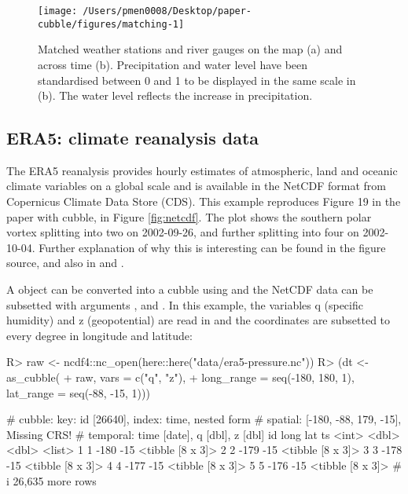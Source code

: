 \documentclass[
  shortnames]{jss}
\begin{document}
\begin{CodeChunk}
\begin{figure}

{\centering \texttt{[image: /Users/pmen0008/Desktop/paper-cubble/figures/matching-1]} 

}

\caption[Matched weather stations and river gauges on the map (a) and across time (b)]{Matched weather stations and river gauges on the map (a) and across time (b). Precipitation and water level have been standardised between 0 and 1 to be displayed in the same scale in (b). The water level reflects the increase in precipitation.}\label{fig:matching}
\end{figure}
\end{CodeChunk}

\hypertarget{era5-climate-reanalysis-data}{%
\subsection{ERA5: climate reanalysis data}\label{era5-climate-reanalysis-data}}

The ERA5 reanalysis \citep{hersbach2020era5} provides hourly estimates of atmospheric, land and oceanic climate variables on a global scale and is available in the NetCDF format from Copernicus Climate Data Store (CDS). This example reproduces Figure 19 in the \citet{hersbach2020era5} paper with cubble, in Figure \ref{fig:netcdf}. The plot shows the southern polar vortex splitting into two on 2002-09-26, and further splitting into four on 2002-10-04. Further explanation of why this is interesting can be found in the figure source, and also in \citet{simmons2020global} and \citet{simmons2005ecmwf}.

A  object \citep{ncdf4} can be converted into a cubble using  and the NetCDF data can be subsetted with arguments ,  and . In this example, the variables q (specific humidity) and z (geopotential) are read in and the coordinates are subsetted to every degree in longitude and latitude:

\begin{CodeChunk}
\begin{CodeInput}
R> raw <- ncdf4::nc_open(here::here("data/era5-pressure.nc"))
R> (dt <- as_cubble(
+   raw, vars = c("q", "z"),
+   long_range = seq(-180, 180, 1), lat_range = seq(-88, -15, 1)))
\end{CodeInput}
\begin{CodeOutput}
# cubble:   key: id [26640], index: time, nested form
# spatial:  [-180, -88, 179, -15], Missing CRS!
# temporal: time [date], q [dbl], z [dbl]
     id  long   lat ts              
  <int> <dbl> <dbl> <list>          
1     1  -180   -15 <tibble [8 x 3]>
2     2  -179   -15 <tibble [8 x 3]>
3     3  -178   -15 <tibble [8 x 3]>
4     4  -177   -15 <tibble [8 x 3]>
5     5  -176   -15 <tibble [8 x 3]>
# i 26,635 more rows
\end{CodeOutput}
\end{CodeChunk}
\end{document}
